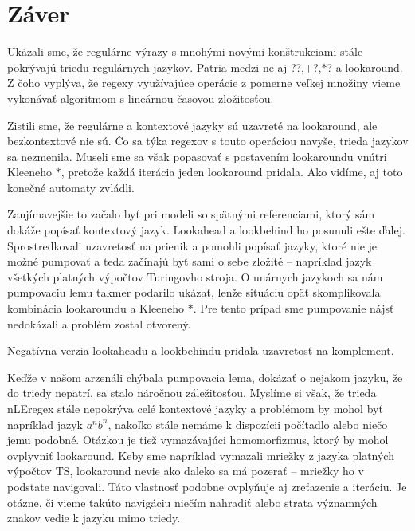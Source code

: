 \chapter*{Záver}\label{chap:conc}
{}

Ukázali sme, že regulárne výrazy s mnohými novými konštrukciami stále pokrývajú triedu regulárnych jazykov. Patria medzi ne aj ??,+?,$*$? a lookaround. Z čoho vyplýva, že regexy využívajúce operácie z pomerne veľkej množiny vieme vykonávať algoritmom s lineárnou časovou zložitosťou.

Zistili sme, že regulárne a kontextové jazyky sú uzavreté na lookaround, ale bezkontextové nie sú. Čo sa týka regexov s touto operáciou navyše, trieda jazykov sa nezmenila. Museli sme sa však popasovať s postavením lookaroundu vnútri Kleeneho $*$, pretože každá iterácia jeden lookaround pridala. Ako vidíme, aj toto konečné automaty zvládli.

Zaujímavejšie to začalo byť pri modeli so spätnými referenciami, ktorý sám dokáže popísať kontextový jazyk. Lookahead a lookbehind ho posunuli ešte ďalej. Sprostredkovali uzavretosť na prienik a pomohli popísať jazyky, ktoré nie je možné pumpovať a teda začínajú byť sami o sebe zložité -- napríklad jazyk všetkých platných výpočtov Turingovho stroja. O unárnych jazykoch sa nám pumpovaciu lemu takmer podarilo ukázať, lenže situáciu opäť skomplikovala kombinácia lookaroundu a Kleeneho $*$. Pre tento prípad sme pumpovanie nájsť nedokázali a problém zostal otvorený.

Negatívna verzia lookaheadu a lookbehindu pridala uzavretosť na komplement.

Keďže v našom arzenáli chýbala pumpovacia lema, dokázať o nejakom jazyku, že do triedy nepatrí, sa stalo náročnou záležitosťou. Myslíme si však, že trieda nLEregex stále nepokrýva celé kontextové jazyky a problémom by mohol byť napríklad jazyk $a^nb^n$, nakoľko stále nemáme k dispozícii počítadlo alebo niečo jemu podobné. Otázkou je tiež vymazávajúci homomorfizmus, ktorý by mohol ovplyvniť lookaround. Keby sme napríklad vymazali mriežky z jazyka platných výpočtov TS, lookaround nevie ako ďaleko sa má pozerať -- mriežky ho v podstate navigovali. Táto vlastnosť podobne ovplyňuje aj zreťazenie a iteráciu. Je otázne, či vieme takúto navigáciu niečím nahradiť alebo strata významných znakov vedie k jazyku mimo triedy.

